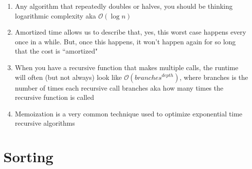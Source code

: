 \documentclass [12pt, executivepaper]{article}
\begin{document}
\begin{enumerate}
\begin{enumerate}
\item Any algorithm that repeatedly doubles or halves, you should be thinking logarithmic complexity aka $\mathcal{O}(\log{} n)$
\item Amortized time allows us to describe that, yes, this worst case happens every once in a while. But, once this happens, it won't happen again for so long that the cost is ``amortized"

\item When you have a recursive function that makes multiple calls, the runtime will often (but not always) look like $\mathcal{O}(branches^{depth})$, where branches is the number of times each recursive call branches aka 
how many times the recursive function is called

\item Memoization is a very common technique used to optimize exponential time recursive algorithms

\end{enumerate}

\end{enumerate}

\pagebreak

\vspace*{-40mm}


\section*{Sorting}
\end{document}
